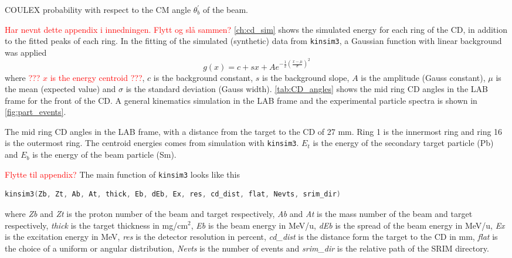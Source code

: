 \documentclass[twoside,english]{uiofysmaster/uiofysmaster}
\let\orgautoref\autoref
\renewcommand{\autoref}
        {%
		 \def\sectionautorefname{Section}%
		 \def\subsectionautorefname{Section}%
		 \def\subsubsectionautorefname{Section}%
		 \def\chapterautorefname{Chapter}%
          \orgautoref}
\begin{document}
\begin{table}[htb] 
    \centering 
    \caption{COULEX probability with respect to the CM angle $\theta_b^{'}$ of the beam.}
	
	\label{tab:P_CE}
\end{table}

\textcolor{red}{Har nevnt dette appendix i innedningen. Flytt og slå sammen?}\newline
\autoref{ch:cd_sim} shows the simulated energy for each ring of the CD, in addition to the fitted peaks of each ring.
In the fitting of the simulated (synthetic) data from \texttt{kinsim3}, a Gaussian function with linear background was applied
\begin{equation}
	g(x) = c + sx + A e^{-\frac{1}{2}\left(\frac{x - \mu}{\sigma}\right)^2}
\end{equation}
where \textcolor{red}{??? $x$ is the energy centroid ???}, $c$ is the background constant, $s$ is the background slope, $A$ is the amplitude (Gauss constant), $\mu$ is the mean (expected value) and $\sigma$ is the standard deviation (Gauss width). 
\autoref{tab:CD_angles} shows the mid ring CD angles in the LAB frame for the front of the CD. 
A general kinematics simulation in the LAB frame and the experimental particle spectra is shown in \autoref{fig:part_events}. 

\begin{table}[htb] 
    \centering 
    \caption{The mid ring CD angles in the LAB frame, with a distance from the target to the CD of 27 mm. 
    Ring 1 is the innermost ring and ring 16 is the outermost ring. 
    The centroid energies comes from simulation with \texttt{kinsim3}. 
    $E_t$ is the energy of the secondary target particle (Pb) and $E_b$ is the energy of the beam particle (Sm).}
	
	\label{tab:CD_angles}
\end{table}

\textcolor{red}{Flytte til appendix?}\newline
The main function of \texttt{kinsim3} looks like this
\begin{lstlisting}[language=c++]
kinsim3(Zb, Zt, Ab, At, thick, Eb, dEb, Ex, res, cd_dist, flat, Nevts, srim_dir)
\end{lstlisting}
where \textit{Zb} and \textit{Zt} is the proton number of the beam and target respectively, \textit{Ab} and \textit{At} is the mass number of the beam and target respectively, \textit{thick} is the target thickness in mg/cm$^2$, \textit{Eb} is the beam energy in MeV/u, \textit{dEb} is the spread of the beam energy in MeV/u, \textit{Ex} is the excitation energy in MeV, \textit{res} is the detector resolution in percent, \textit{cd\_dist} is the distance form the target to the CD in mm, \textit{flat} is the choice of a uniform or angular distribution, \textit{Nevts} is the number of events and \textit{srim\_dir} is the relative path of the SRIM directory.
\end{document}
